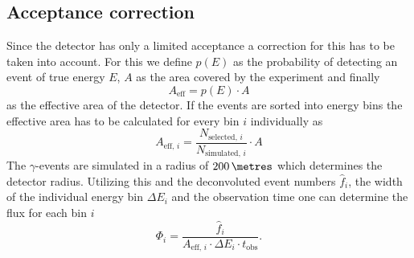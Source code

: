 \subsection{Acceptance correction}
Since the detector has only a limited acceptance a correction for this has to be taken into account. 
For this we define $p(E)$ as the probability of detecting an event of true energy $E$, $A$ as the 
area covered by the experiment and finally 
\begin{equation}
    A_\text{eff} = p(E) \cdot A
\end{equation}
as the effective area of the detector. If the events are sorted into energy bins the effective area has to be calculated for 
every bin $i$ individually as 
\begin{equation}
    A_{\text{eff}, \, i} = \frac{N_{\text{selected}, \, i}}{N_{\text{simulated}, \, i}} \cdot A
\end{equation}
The $\gamma$-events are simulated in a radius of $200 \, \si{\metres}$ which determines the detector radius.
Utilizing this and the deconvoluted event numbers $\hat{f}_i$, the width of the individual energy bin $\Delta E_i$ and the observation time 
one can determine the flux for each bin $i$
\begin{equation}
    \Phi_i = \frac{\hat{f}_i}{A_{\text{eff}, \, i} \cdot \Delta E_i \cdot t_\text{obs}}.
\end{equation}